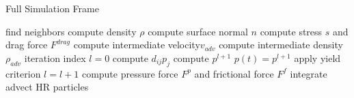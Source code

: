 \documentclass[intern]{cgMA}
\begin{document}
    \begin{algorithm}[H]
        \caption{Full Simulation Frame}
        \label{alg:main}
        \begin{algorithmic}[1]
        \State find neighbors 
        \State compute density $\rho$ 
        \State compute surface normal $n$
        \State compute stress $s$ and drag force $F^{drag}$ 
        \State compute intermediate velocity$v_{adv}$
        \State compute intermediate density $\rho_{adv}$
        \State iteration index $l = 0$
            \State compute $d_{ij}p_{j}$
            \State compute $p^{l+1}$
            \State $p(t) = p^{l+1}$
            \State apply yield criterion 
            \State $l = l+1$
        \EndWhile
        \State compute pressure force $F^p$ and frictional force $F^f$ 
        \State integrate 
        \State advect HR particles 
        \end{algorithmic}
    \end{algorithm}
\end{document}
